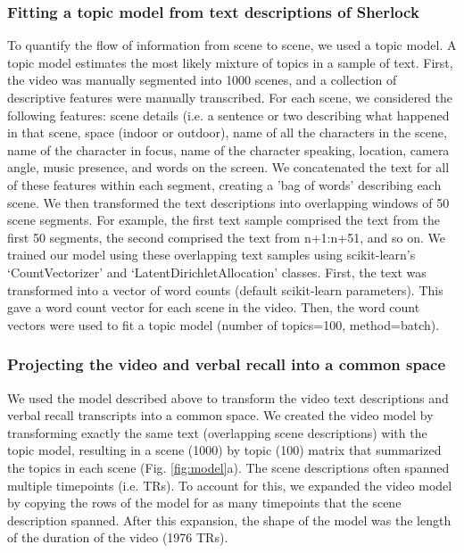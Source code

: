 \subsubsection{Fitting a topic model from text descriptions of Sherlock}
To quantify the flow of information from scene to scene, we used a topic model. A topic model estimates the most likely mixture of topics in a sample of text. First, the video was manually segmented into 1000 scenes, and a collection of descriptive features were manually transcribed.  For each scene, we considered the following features: scene details (i.e. a sentence or two describing what happened in that scene, space (indoor or outdoor), name of all the characters in the scene, name of the character in focus, name of the character speaking, location, camera angle, music presence, and words on the screen. We concatenated the text for all of these features within each segment, creating a 'bag of words' describing each scene. We then transformed the text descriptions into overlapping windows of 50 scene segments. For example, the first text sample comprised the text from the first 50 segments, the second comprised the text from n+1:n+51, and so on. We trained our model using these overlapping text samples using scikit-learn's `CountVectorizer' and `LatentDirichletAllocation' classes.  First, the text was transformed into a vector of word counts (default scikit-learn parameters). This gave a word count vector for each scene in the video.  Then, the word count vectors were used to fit a topic model (number of topics=100, method=batch).

\subsubsection{Projecting the video and verbal recall into a common space}
We used the model described above to transform the video text descriptions and verbal recall transcripts into a common space.  We created the video model by transforming exactly the same text (overlapping scene descriptions) with the topic model, resulting in a scene (1000) by topic (100) matrix that summarized the topics in each scene (Fig. \ref{fig:model}a). The scene descriptions often spanned multiple timepoints (i.e. TRs). To account for this, we expanded the video model by copying the rows of the model for as many timepoints that the scene description spanned. After this expansion, the shape of the model was the length of the duration of the video (1976 TRs).


